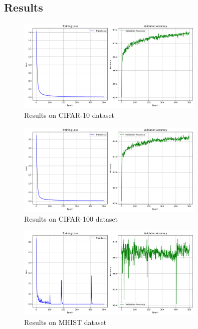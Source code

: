 \documentclass[onecolumn]{IEEEtran}
\begin{document}
\subsection{Results}

\begin{figure}[H]
    \centering
    \includegraphics[width=0.8\textwidth]{images/cifar10.png}
    \caption{Results on CIFAR-10 dataset}
    \label{fig:cifar10}
\end{figure}
\begin{figure}[H]
    \centering
    \includegraphics[width=0.8\textwidth]{images/cifar100.png}
    \caption{Results on CIFAR-100 dataset}
    \label{fig:cifar100}
\end{figure}
\begin{figure}[H]
    \centering
    \includegraphics[width=0.8\textwidth]{images/MHIST.png}
    \caption{Results on MHIST dataset}
    \label{fig:mhist}
\end{figure}
\end{document}

